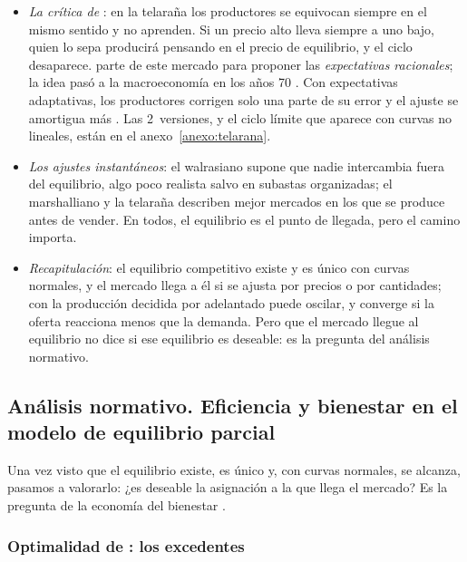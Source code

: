 \documentclass[11pt]{article}
\begin{document}
\begin{itemize}
\item \emph{La crítica de }: en la telaraña los productores se equivocan siempre en el mismo sentido y no aprenden. Si un precio alto lleva siempre a uno bajo, quien lo sepa producirá pensando en el precio de equilibrio, y el ciclo desaparece. \textcite{Muth1961Rational} parte de este mercado para proponer las \emph{expectativas racionales}; la idea pasó a la macroeconomía en los años 70\nocite{Campante2021Advanced} . Con expectativas adaptativas\nocite{Nerlove1958Adaptive}, los productores corrigen solo una parte de su error y el ajuste se amortigua más . Las 2~versiones, y el ciclo límite que aparece con curvas no lineales, están en el anexo~\ref{anexo:telarana}.
\item \emph{Los ajustes instantáneos}: el walrasiano supone que nadie intercambia fuera del equilibrio, algo poco realista salvo en subastas organizadas; el marshalliano y la telaraña describen mejor mercados en los que se produce antes de vender. En todos, el equilibrio es el punto de llegada, pero el camino importa.
\item \emph{Recapitulación}: el equilibrio competitivo existe y es único con curvas normales, y el mercado llega a él si se ajusta por precios o por cantidades; con la producción decidida por adelantado puede oscilar, y converge si la oferta reacciona menos que la demanda. Pero que el mercado llegue al equilibrio no dice si ese equilibrio es deseable: es la pregunta del análisis normativo.
\end{itemize}

\subsection{Análisis normativo. Eficiencia y bienestar\cortetitulo{} en el modelo de equilibrio parcial}\label{sec:analisis-normativo-eficiencia}

Una vez visto que el equilibrio existe, es único y, con curvas normales, se alcanza, pasamos a valorarlo: ¿es deseable la asignación a la que llega el mercado? Es la pregunta de la economía del bienestar .

\subsubsection{Optimalidad de : los excedentes}\label{sec:optimalidad-pareto-excedentes}
\end{document}
